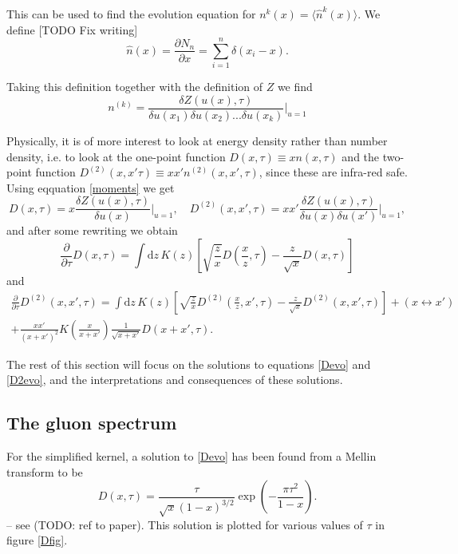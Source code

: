 \documentclass[a4paper,12pt]{article}
\newcommand{\party}[2]{\frac{\partial{#1}}{\partial{#2}}}
\numberwithin{equation}{section}
\begin{document}
This can be used to find the evolution equation for $n^k(x)=\langle \hat{n}^k(x) \rangle$. We define [TODO Fix writing]
\begin{equation}
\hat{n}(x)=\party{N_n}{x}=\sum_{i=1}^n \delta(x_i-x).
\end{equation}

Taking this definition together with the definition of $Z$ we find
\begin{equation}\label{moments}
n^{(k)}=\frac{\delta Z(u(x),\tau)}{\delta u(x_1)\delta u(x_2)...\delta u(x_k)}\Bigg|_{u=1}
\end{equation}

Physically, it is of more interest to look at energy density rather than number density, i.e. to look at the one-point function $D(x,\tau)\equiv xn(x,\tau)$ and the two-point function $D^{(2)}(x,x'\tau)\equiv xx'n^{(2)}(x,x',\tau)$, since these are infra-red safe. Using eqquation \eqref{moments} we get
\begin{equation}
D(x,\tau)=x \frac{\delta Z(u(x),\tau)}{\delta u(x)}\Bigg|_{u=1},\quad D^{(2)}(x,x',\tau)=xx' \frac{\delta Z(u(x),\tau)}{\delta u(x)\delta u(x')}\Bigg|_{u=1},
\end{equation}
and after some rewriting we obtain
\begin{equation}\label{Devo}
\party{}{\tau}D(x,\tau)=\int \mathrm{d}z\, K(z) \left[\sqrt{\frac{z}{x}} D\left(\frac{x}{z},\tau\right)- \frac{z}{\sqrt{x}}D(x,\tau)  \right]
\end{equation}
and
\begin{multline}\label{D2evo}
\party{}{\tau}D^{(2)}(x,x',\tau)=\int \mathrm{d}z\, K(z) \left[ \sqrt{\frac{z}{x}} D^{(2)}\left(\frac{x}{z},x',\tau\right) - \frac{z}{\sqrt{x}} D^{(2)}(x,x',\tau)\right]+(x \leftrightarrow x') \\
+ \frac{xx'}{(x+x')^2} K\left(\frac{x}{x+x'}\right) \frac{1}{\sqrt{x+x'}} D(x+x',\tau).
\end{multline}


The rest of this section will focus on the solutions to equations \eqref{Devo} and \eqref{D2evo}, and the interpretations and consequences of these solutions.

\subsection{The gluon spectrum}\label{onepoint}
For the simplified kernel, a solution to \eqref{Devo} has been found from a Mellin transform to be
\begin{equation}\label{Mellin}
D(x,\tau) = \frac{\tau}{\sqrt{x}(1-x)^{3/2}}\exp\left(-\frac{\pi \tau^2}{1-x}\right).
\end{equation}
-- see (TODO: ref to paper). This solution is plotted for various values of $\tau$ in figure \ref{Dfig}.
\end{document}
